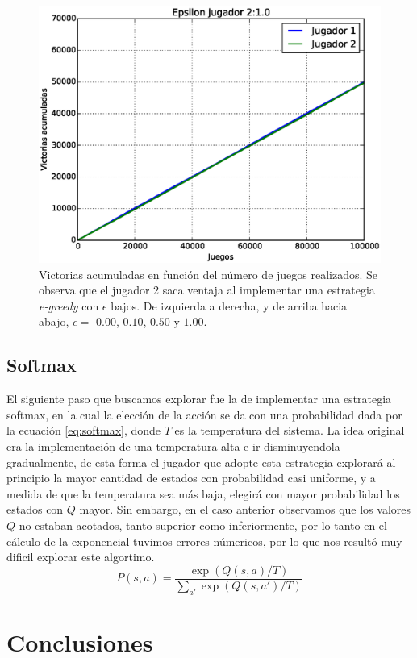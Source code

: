 \documentclass[11pt, spanish]{article}
\begin{document}
\begin{figure}
\includegraphics[scale = 0.3]{figuras/Epsilon10.eps}
\caption{Victorias acumuladas en función del número de juegos realizados. Se observa que el jugador 2 saca ventaja al implementar una estrategia \emph{e-greedy} con $\epsilon$ bajos. De izquierda a derecha, y de arriba hacia abajo, $\epsilon = $ $0.00$, $0.10$, $0.50$ y $1.00$.}
\label{fig:e_greedy}
\end{figure}

\subsection{Softmax}
\par El siguiente paso que buscamos explorar fue la de implementar una estrategia softmax, en la cual la elección de la acción se da con una probabilidad dada por la ecuación \ref{eq:softmax}, donde $T$ es la temperatura del sistema. La idea original era la implementación de una temperatura alta e ir disminuyendola gradualmente, de esta forma el jugador que adopte esta estrategia explorará al principio la mayor cantidad de estados con probabilidad casi uniforme, y a medida de que la temperatura sea más baja, elegirá con mayor probabilidad los estados con $Q$ mayor. Sin embargo, en el caso anterior observamos que los valores $Q$ no estaban acotados, tanto superior como inferiormente, por lo tanto en el cálculo de la exponencial tuvimos errores númericos, por lo que nos resultó muy dificil explorar este algortimo.
\begin{equation}
P(s,a) = \frac{\exp(Q(s,a)/T)}{\sum_{a'}{\exp(Q(s,a')/T)}}
\label{eq:softmax}
\end{equation}



\section{Conclusiones}
\end{document}
